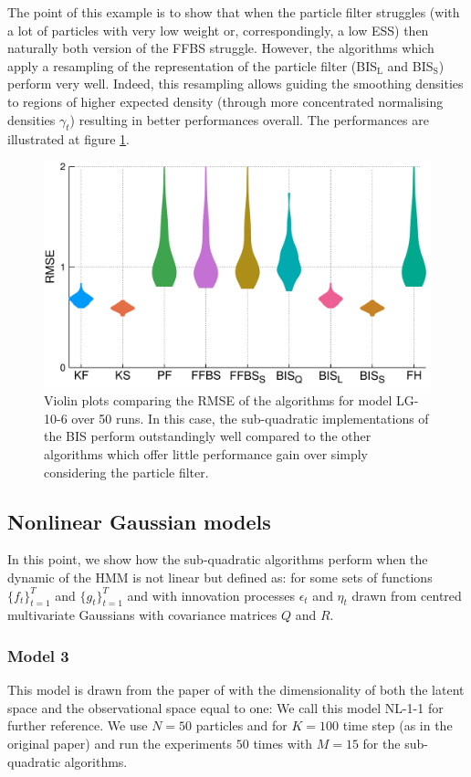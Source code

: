 The point of this example is to show that when the particle filter struggles (with a lot of particles with very low weight or, correspondingly, a low ESS) then naturally both version of the FFBS struggle. 
However, the algorithms which apply a resampling of the representation of the particle filter (BIS$_{\text{L}}$ and BIS$_{\text{S}}$) perform very well. Indeed, this resampling allows guiding the smoothing densities to regions of higher expected density (through more concentrated normalising densities $\gamma_{t}$) resulting in better performances overall. The performances are illustrated at figure \ref{comp-model2}.

\begin{figure}[!h]
\center
\includegraphics[width=.65\textwidth]{figures/tfs/comparison_mod2}
\caption{\label{comp-model2}Violin plots comparing the RMSE of the algorithms for model LG-10-6 over 50 runs. In this case, the sub-quadratic implementations of the BIS perform outstandingly well compared to the other algorithms which offer little performance gain over simply considering the particle filter.}
\end{figure}

\newpage

\subsection{Nonlinear Gaussian models}
In this point, we show how the sub-quadratic algorithms perform when the dynamic of the HMM is not linear but defined as:
%
%
for some sets of functions $\{f_{t}\}_{t=1}^{T}$ and $\{g_{t}\}_{t=1}^{T}$ and with innovation processes $\epsilon_{t}$ and $\eta_{t}$ drawn from centred multivariate Gaussians with covariance matrices $Q$ and $R$.

\subsubsection{Model 3}
This model is drawn from the paper of \citet{arulampalam02} with the dimensionality of both the latent space and the observational space equal to one:
%
%
We call this model NL-1-1 for further reference. We use $N=50$ particles and for $K=100$ time step (as in the original paper) and run the experiments $50$ times with $M=15$ for the sub-quadratic algorithms.

